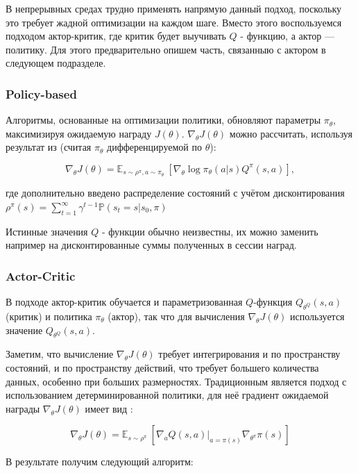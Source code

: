 \documentclass[14pt]{extarticle}
\begin{document}
В непрерывных средах трудно применять напрямую данный подход, поскольку это требует жадной оптимизации на каждом шаге.
Вместо этого воспользуемся подходом актор-критик, где критик будет выучивать $Q$ - функцию, а актор --- политику. Для этого предварительно опишем часть, связанныю с актором в следующем подразделе.

\subsubsection{Policy-based}

Алгоритмы, основанные на оптимизации политики, обновляют параметры $\pi_{\theta}$, максимизируя ожидаемую награду $J(\theta)$.
$\nabla_{\theta} J(\theta)$ можно рассчитать, используя результат из \cite{pg} (считая $\pi_{\theta}$ дифференцируемой по $\theta$):

$$ \nabla_{\theta} J(\theta) = \mathbb{E}_{s\sim \rho^{\pi}, a\sim \pi_{\theta}} \ \left[\nabla_{\theta} \log \pi_{\theta} (a|s) Q^{\pi}(s, a)\right],$$

где дополнительно введено распределение состояний с учётом дисконтирования $\rho^{\pi}(s) = \sum\limits_{t=1}^{\infty} \gamma^{t-1} \mathbb{P} (s_t=s|s_0, \pi)$

Истинные значения $Q$ - функции обычно неизвестны, их можно заменить например на дисконтированные суммы полученных в сессии наград.

\subsubsection{Actor-Critic}

В подходе актор-критик обучается и параметризованная $Q$-функция $Q_{\theta^Q}(s, a)$ (критик) и политика $\pi_{\theta}$ (актор), так что для вычисления $\nabla_{\theta} J(\theta)$ используется значение $Q_{\theta^Q}(s, a)$.

Заметим, что вычисление $\nabla_{\theta} J(\theta)$ требует интегрирования и по пространству состояний, и по пространству действий, что требует большего количества данных, особенно при больших размерностях. Традиционным является подход с использованием детерминированной политики, для неё градиент ожидаемой награды $\nabla_{\theta} J(\theta)$ имеет вид \cite{dpg}:

$$ \nabla_{\theta} J(\theta) = \mathbb{E}_{s\sim \rho^{\pi}} \ \left[ \nabla_a Q(s, a)|_{a = \pi(s)}\nabla_{\theta^{\pi}} \pi (s)\right]$$

В результате получим следующий алгоритм:
\end{document}
